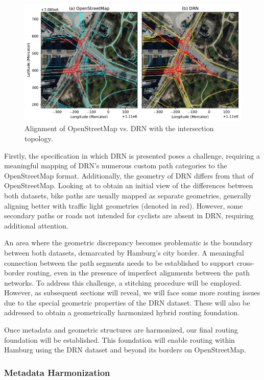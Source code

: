 \begin{figure}[t]
\centering
\includegraphics[width=\linewidth]{images/routing-drn-osm-intersection.pdf}
\caption{Alignment of OpenStreetMap vs. DRN with the intersection topology.}
\label{fig:comparison}
\end{figure}

Firstly, the specification in which DRN is presented poses a challenge, requiring a meaningful mapping of DRN's numerous custom path categories to the OpenStreetMap format. Additionally, the geometry of DRN differs from that of OpenStreetMap. Looking at  to obtain an initial view of the differences between both datasets, bike paths are usually mapped as separate geometries, generally aligning better with traffic light geometries (denoted in red). However, some secondary paths or roads not intended for cyclists are absent in DRN, requiring additional attention.

An area where the geometric discrepancy becomes problematic is the boundary between both datasets, demarcated by Hamburg's city border. A meaningful connection between the path segments needs to be established to support cross-border routing, even in the presence of imperfect alignments between the path networks. To address this challenge, a stitching procedure will be employed. However, as subsequent sections will reveal, we will face some more routing issues due to the special geometric properties of the DRN dataset. These will also be addressed to obtain a geometrically harmonized hybrid routing foundation. 

Once metadata and geometric structures are harmonized, our final routing foundation will be established. This foundation will enable routing within Hamburg using the DRN dataset and beyond its borders on OpenStreetMap.

\subsubsection{Metadata Harmonization}

